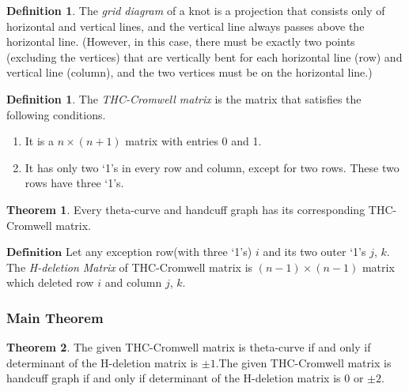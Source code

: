 \documentclass{article}
\theoremstyle{definition}
\newtheorem{defn}[thm]{Definition}
\theoremstyle{theorem}
\newtheorem{theorem}{Theorem}
\theoremstyle{proposition}
\theoremstyle{corollary}
\begin{document}
\begin{defn}
The \textit{grid diagram} of a knot is a projection that consists only of horizontal and vertical lines, and the vertical line always passes above the horizontal line. (However, in this case, there must be exactly two points (excluding the vertices) that are vertically bent for each horizontal line (row) and vertical line (column), and the two vertices must be on the horizontal line.)
\end{defn}
\begin{defn}
The \textit{THC-Cromwell matrix} is the matrix that satisfies the following conditions.
\end{defn}
\begin{enumerate}
    \item It is a $n\times(n+1)$ matrix with entries 0 and 1.
    \item It has only two `1's in every row and column, except for two rows. These two rows have three `1's.
\end{enumerate}
\begin{theorem}
Every theta-curve and handcuff graph has its corresponding THC-Cromwell matrix.
\end{theorem}
$\mathbf{Definition}$ Let any exception row(with three `1's) $i$ and its two outer `1's $j$, $k$. The \textit{H-deletion Matrix} of THC-Cromwell matrix is $(n-1)\times(n-1)$ matrix which deleted row $i$ and column $j$, $k$.\\

\subsubsection{Main Theorem}
\begin{theorem}The given THC-Cromwell matrix is theta-curve if and only if determinant of the H-deletion matrix is $\pm 1$.The given THC-Cromwell matrix is handcuff graph if and only if determinant of the H-deletion matrix is 0 or $\pm 2$.
\end{theorem}
\end{document}

